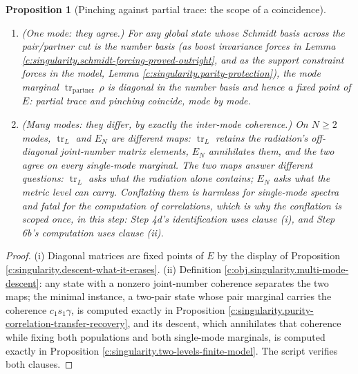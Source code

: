 \documentclass[11pt]{article}
\newtheorem{proposition}[theorem]{Proposition}
\theoremstyle{definition}
\theoremstyle{plain}
\providecommand{\EN}{}\renewcommand{\EN}{E_{N}}
\providecommand{\tr}{}\renewcommand{\tr}{\operatorname{tr}}
\begin{document}
\begin{proposition}[Pinching against partial trace: the scope of a coincidence]\label{c:singularity.pinching-against-partial-trace-scope-coincidence}
\leavevmode
\begin{enumerate}
\item[(i)] (One mode: they agree.) For any global state whose Schmidt basis across the pair/partner cut is the number basis (as boost invariance forces in Lemma \ref{c:singularity.schmidt-forcing-proved-outright}, and as the support constraint forces in the model, Lemma \ref{c:singularity.parity-protection}), the mode marginal $\tr_{\mathrm{partner}}\,\rho$ is diagonal in the number basis and hence a fixed point of $E$: partial trace and pinching coincide, mode by mode.
\item[(ii)] (Many modes: they differ, by exactly the inter-mode coherence.) On $N \geq 2$ modes, $\tr_L$ and $\EN$ are different maps: $\tr_L$ retains the radiation's off-diagonal joint-number matrix elements, $\EN$ annihilates them, and the two agree on every single-mode marginal. The two maps answer different questions: $\tr_L$ asks what the radiation alone contains; $\EN$ asks what the metric level can carry. Conflating them is harmless for single-mode spectra and fatal for the computation of correlations, which is why the conflation is scoped once, in this step: Step 4d's identification uses clause (i), and Step 6b's computation uses clause (ii).
\end{enumerate}
\end{proposition}
\begin{proof}
(i) Diagonal matrices are fixed points of $E$ by the display of Proposition \ref{c:singularity.descent-what-it-erases}. (ii) Definition \ref{c:obj.singularity.multi-mode-descent}: any state with a nonzero joint-number coherence separates the two maps; the minimal instance, a two-pair state whose pair marginal carries the coherence $c_1 s_1 \gamma$, is computed exactly in Proposition \ref{c:singularity.purity-correlation-transfer-recovery}, and its descent, which annihilates that coherence while fixing both populations and both single-mode marginals, is computed exactly in Proposition \ref{c:singularity.two-levels-finite-model}. The script verifies both clauses.

\end{proof}
\end{document}
